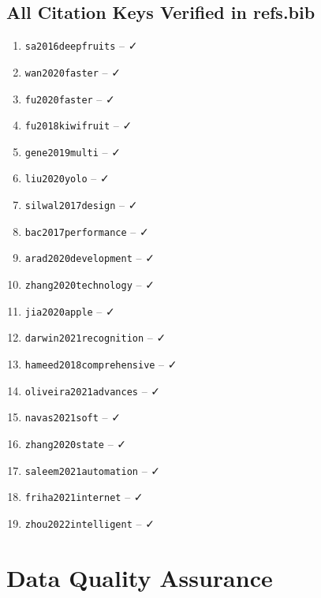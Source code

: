 \documentclass[11pt]{article}
\begin{document}
\subsection{All Citation Keys Verified in refs.bib}
\begin{enumerate}
    \item \texttt{sa2016deepfruits} -- \cite{sa2016deepfruits} ✓
    \item \texttt{wan2020faster} -- \cite{wan2020faster} ✓
    \item \texttt{fu2020faster} -- \cite{fu2020faster} ✓
    \item \texttt{fu2018kiwifruit} -- \cite{fu2018kiwifruit} ✓
    \item \texttt{gene2019multi} -- \cite{gene2019multi} ✓
    \item \texttt{liu2020yolo} -- \cite{liu2020yolo} ✓
    \item \texttt{silwal2017design} -- \cite{silwal2017design} ✓
    \item \texttt{bac2017performance} -- \cite{bac2017performance} ✓
    \item \texttt{arad2020development} -- \cite{arad2020development} ✓
    \item \texttt{zhang2020technology} -- \cite{zhang2020technology} ✓
    \item \texttt{jia2020apple} -- \cite{jia2020apple} ✓
    \item \texttt{darwin2021recognition} -- \cite{darwin2021recognition} ✓
    \item \texttt{hameed2018comprehensive} -- \cite{hameed2018comprehensive} ✓
    \item \texttt{oliveira2021advances} -- \cite{oliveira2021advances} ✓
    \item \texttt{navas2021soft} -- \cite{navas2021soft} ✓
    \item \texttt{zhang2020state} -- \cite{zhang2020state} ✓
    \item \texttt{saleem2021automation} -- \cite{saleem2021automation} ✓
    \item \texttt{friha2021internet} -- \cite{friha2021internet} ✓
    \item \texttt{zhou2022intelligent} -- \cite{zhou2022intelligent} ✓
\end{enumerate}

\section{Data Quality Assurance}
\end{document}
